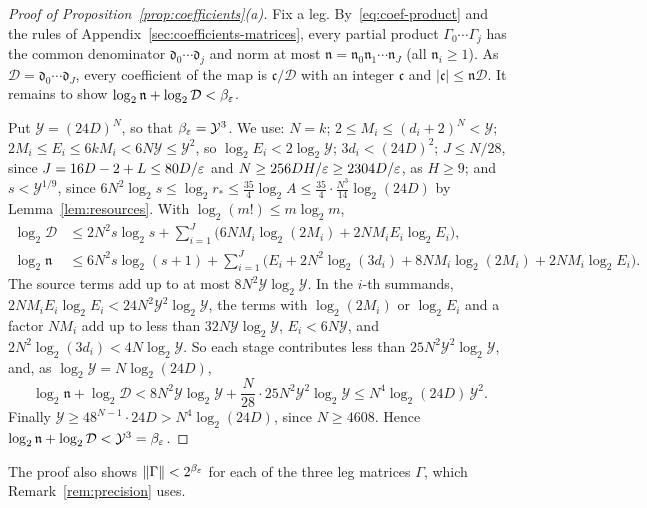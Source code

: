 \begin{proof}[Proof of Proposition~\ref{prop:coefficients}(a)]
Fix a leg. By~\eqref{eq:coef-product} and the rules of
Appendix~\ref{sec:coefficients-matrices}, every partial product
\(\Gamma_0\cdots\Gamma_j\) has the common denominator
\(\mathfrak d_0\cdots\mathfrak d_j\) and norm at most
\(\mathfrak n=\mathfrak n_0\mathfrak n_1\cdots\mathfrak n_J\) (all
\(\mathfrak n_i\ge1\)). As \(\mathcal D=\mathfrak d_0\cdots\mathfrak d_J\),
every coefficient of the map is \(\mathfrak c/\mathcal D\) with an
integer \(\mathfrak c\) and \(|\mathfrak c|\le\mathfrak n\mathcal D\). It
remains to show \(\log_2\mathfrak n+\log_2\mathcal D<\beta_\varepsilon\).

Put \(\mathcal Y=(24D)^N\), so that \(\beta_\varepsilon=\mathcal Y^3\). We use:
\(N=k\); \(2\le M_i\le(d_i+2)^N<\mathcal Y\);
\(2M_i\le E_i\le6kM_i<6N\mathcal Y\le\mathcal Y^2\), so
\(\log_2E_i<2\log_2\mathcal Y\); \(3d_i<(24D)^2\); \(J\le N/28\), since
\(J=16D-2+L\le80D/\varepsilon\) and \(N\ge256DH/\varepsilon\ge2304D/\varepsilon\), as
\(H\ge9\); and \(s<\mathcal Y^{1/9}\), since
\(6N^2\log_2s\le\log_2r_*\le\frac{35}4\log_2A\le\frac{35}4\cdot
\frac{N^3}{14}\log_2(24D)\) by Lemma~\ref{lem:resources}. With
\(\log_2(m!)\le m\log_2m\),
\begin{align*}
 \log_2\mathcal D&\le2N^2s\log_2s+\sum_{i=1}^J\bigl(6NM_i\log_2(2M_i)
 +2NM_iE_i\log_2E_i\bigr),\\
 \log_2\mathfrak n&\le6N^2s\log_2(s+1)+\sum_{i=1}^J\bigl(E_i
 +2N^2\log_2(3d_i)+8NM_i\log_2(2M_i)+2NM_i\log_2E_i\bigr).
\end{align*}
The source terms add up to at most \(8N^2\mathcal Y\log_2\mathcal Y\). In
the \(i\)-th summands, \(2NM_iE_i\log_2E_i<24N^2\mathcal Y^2\log_2\mathcal Y\),
the terms with \(\log_2(2M_i)\) or \(\log_2E_i\) and a factor \(NM_i\) add
up to less than \(32N\mathcal Y\log_2\mathcal Y\),
\(E_i<6N\mathcal Y\), and
\(2N^2\log_2(3d_i)<4N\log_2\mathcal Y\). So each stage contributes less
than \(25N^2\mathcal Y^2\log_2\mathcal Y\), and, as
\(\log_2\mathcal Y=N\log_2(24D)\),
\[
 \log_2\mathfrak n+\log_2\mathcal D
 <8N^2\mathcal Y\log_2\mathcal Y+\frac N{28}\cdot25N^2\mathcal Y^2\log_2\mathcal Y
 \le N^4\log_2(24D)\,\mathcal Y^2 .
\]
Finally \(\mathcal Y\ge48^{N-1}\cdot24D>N^4\log_2(24D)\), since
\(N\ge4608\). Hence
\(\log_2\mathfrak n+\log_2\mathcal D<\mathcal Y^3=\beta_\varepsilon\).
\end{proof}

The proof also shows \(\|\Gamma\|<2^{\beta_\varepsilon}\) for each of the three
leg matrices \(\Gamma\), which Remark~\ref{rem:precision} uses.

